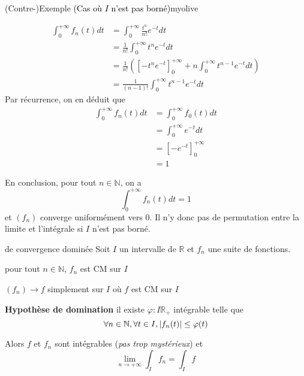 \begin{omed}{(Contre-)Exemple \textcolor{black}{(Cas où $I$ n’est pas borné)}}{myolive}
\begin{itemize}
            \begin{align*}
                \int_{0}^{+\infty} f_n(t)dt
                &= \int_{0}^{+\infty} \frac{t^n}{n!}e^{-t} dt \\
                &= \frac{1}{n!} \int_{0}^{+\infty} t^n e^{-t} dt \\
                &= \frac{1}{n!} \left( \left[ -t^n e^{-t}\right]_0^{+\infty} + n \int_{0}^{+\infty} t^{n-1} e^{-t} dt \right) \\
                &= \frac{1}{(n-1)!} \int_{0}^{+\infty} t^{n-1} e^{-t} dt
            \end{align*}
            Par récurrence, on en déduit que 
            \begin{align*}
                \int_{0}^{+\infty} f_n(t)dt 
                &= \int_{0}^{+\infty} f_0(t) dt \\
                &= \int_{0}^{+\infty} e^{-t} dt \\
                &= \left[ -e^{-t} \right]_0^{+\infty}  \\
                &= 1
            \end{align*}
        \end{itemize}
        En conclusion, pour tout $n \in \mathbb{N}$, on a 
        \[ \int_{0}^{+\infty} f_n(t) dt = 1 \]   
        et $(f_n)$ converge uniformément vers $0$. Il n’y donc pas de permutation entre la limite et l’intégrale \textcolor{myolive}{si $I$ n’est pas borné}.
    \end{omed}

    \begin{theo}{de convergence dominée}{}
        Soit $I$ un intervalle de $\mathbb{R}$ et $f_n$ une suite de fonctions. 
        \begin{suppose}
            \item pour tout $n \in \mathbb{N}$, $f_n$ est CM sur $I$
            \item $(f_n) \to f$ simplement sur $I$ où $f$ est CM sur $I$
            \item \textbf{Hypothèse de domination} \quad il existe $\varphi : I \mathbb{R}_+$ intégrable telle que 
            \[ \forall n \in \mathbb{N}, \forall t \in I, \left\lvert f_n(t)\right\rvert \leq \varphi(t) \]   
        \end{suppose}

        Alors $f$ et $f_n$ sont intégrables (\textit{pas trop mystérieux}) et 
        \[ \lim_{n \to +\infty} \int_I f_n = \int_I f \]
    \end{theo}

